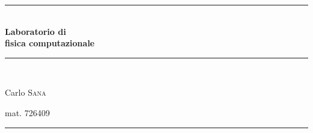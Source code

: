 \newcommand{\HRule}{\rule{\linewidth}{0.5mm}}
\begin{titlepage}
 \begin{center}
  \HRule \\[0.4cm]
{ \huge \bfseries Laboratorio di \\
fisica computazionale}\\[0.4cm]
\HRule \\[1cm]
\begin{flushleft} \Large
Carlo \textsc{Sana} 
\end{flushleft}

\begin{flushright} \Large
	mat. 726409
\end{flushright}
\HRule \\[1cm]

\end{center}

\end{titlepage}
